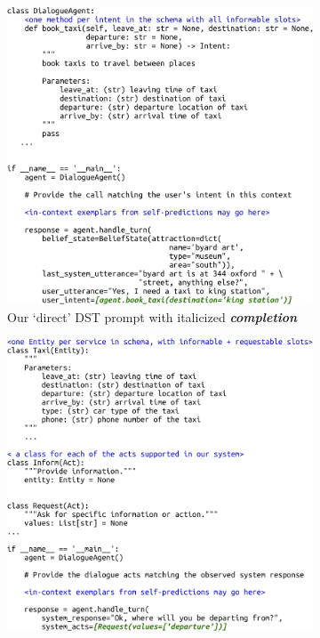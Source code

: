 \documentclass[11pt]{article}
\newcommand{\dstcolor}[1]{\textcolor{dst-color}{#1}}
\begin{document}
\begin{figure}[h]
    \centering
    \begin{subfigure}[b]{0.49\textwidth}
        \centering
        \includegraphics[width=\textwidth]{imgs/direct_dst_prompt_v6.pdf} %
        \caption{Our `direct' DST prompt with italicized \dstcolor{\textit{\textbf{completion}}}}
        \label{fig:direct-dst-prompt}
    \end{subfigure}
    \hfill
    \begin{subfigure}[b]{0.49\textwidth}
        \centering
        \includegraphics[width=\textwidth]{imgs/direct_dat_prompt_v4.pdf} %

\end{subfigure}
\end{figure}
\end{document}
